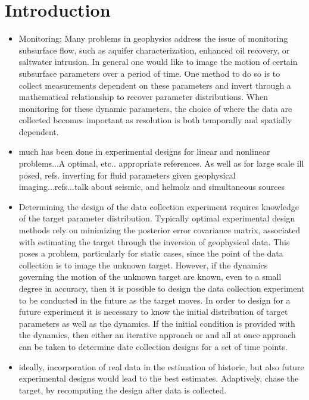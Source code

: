 \documentclass[12pt]{article}
\begin{document}
\section{Introduction} 
\begin{itemize}

\item Monitoring; Many problems in geophysics address the issue of monitoring subsurface flow, such as aquifer characterization, enhanced oil recovery, or saltwater intrusion. In general one would like to image the motion of certain subsurface parameters over a period of time.  One method to do so is to collect measurements dependent on these parameters and invert through a mathematical relationship to recover parameter distributions. When monitoring for these dynamic parameters, the choice of where the data are collected becomes important as resolution is both temporally and spatially dependent. 

\item much has been done in experimental designs for linear and nonlinear problems...A optimal, etc.. appropriate references. As well as for large scale ill posed, refs.  inverting for fluid parameters given geophysical imaging...refs...talk about seismic, and helmolz and simultaneous sources

\item Determining the design of the data collection experiment requires knowledge of the target parameter distribution. Typically optimal experimental design methods rely on minimizing the posterior error covariance matrix, associated with estimating the target through the inversion of geophysical data. This poses a problem, particularly for static cases, since the point of  the data collection is to image the unknown target. However, if the dynamics governing the motion of the unknown target are known, even to a small degree in accuracy, then it is possible to design the data collection experiment to be conducted in the future as the target moves. In order to design for a future experiment it is necessary to know the initial distribution of target parameters as well as the dynamics. If the initial condition is provided with the dynamics, then either an iterative approach or and all at once approach can be taken to determine date collection designs for a set of time points. 
\item ideally, incorporation of real data in the estimation of historic, but also future experimental designs would lead to the best estimates. Adaptively, chase the target, by recomputing the design after data is collected. 


\end{itemize}
\end{document}
